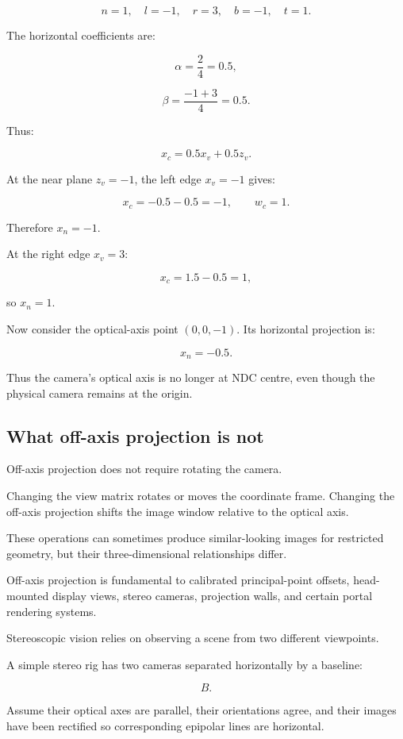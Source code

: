 \[ n=1,\quad l=-1,\quad r=3,\quad b=-1,\quad t=1. \]

The horizontal coefficients are:

\[ \alpha=\frac{2}{4}=0.5, \]

\[ \beta=\frac{-1+3}{4}=0.5. \]

Thus:

\[ x_c=0.5x_v+0.5z_v. \]

At the near plane \(z_v=-1\), the left edge \(x_v=-1\) gives:

\[ x_c=-0.5-0.5=-1,\qquad w_c=1. \]

Therefore \(x_n=-1\).

At the right edge \(x_v=3\):

\[ x_c=1.5-0.5=1, \]

so \(x_n=1\).

Now consider the optical-axis point \((0,0,-1)\). Its horizontal projection is:

\[ x_n=-0.5. \]

Thus the camera's optical axis is no longer at NDC centre, even though the physical camera remains at the origin.

\subsection{What off-axis projection is not}\label{02-foundations-ii-ch035-what-off-axis-projection-is-not}

Off-axis projection does not require rotating the camera.

Changing the view matrix rotates or moves the coordinate frame. Changing the off-axis projection shifts the image window relative to the optical axis.

These operations can sometimes produce similar-looking images for restricted geometry, but their three-dimensional relationships differ.

Off-axis projection is fundamental to calibrated principal-point offsets, head-mounted display views, stereo cameras, projection walls, and certain portal rendering systems.

Stereoscopic vision relies on observing a scene from two different viewpoints.

A simple stereo rig has two cameras separated horizontally by a baseline:

\[ \boxed{B}. \]

Assume their optical axes are parallel, their orientations agree, and their images have been rectified so corresponding epipolar lines are horizontal.

